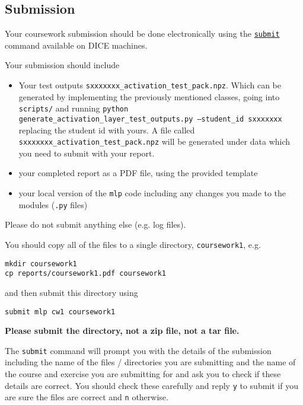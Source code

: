 \documentclass[11pt,]{article}
\begin{document}
\subsection{Submission}
\label{sec:submission}

Your coursework submission should be done electronically using the
\href{http://computing.help.inf.ed.ac.uk/submit}{\texttt{submit}}
command available on DICE machines.

Your submission should include

\begin{itemize}

\item Your test outputs \texttt{sxxxxxxx\_activation\_test\_pack.npz}. Which can be generated by implementing the previously mentioned classes, going into \texttt{scripts/} and running \texttt{python generate\_activation\_layer\_test\_outputs.py --student\_id sxxxxxxx} replacing the student id with yours. A file called \texttt{sxxxxxxx\_activation\_test\_pack.npz} will be generated under data which you need to submit with your report.
\item
  your completed report as a PDF file, using the provided template
\item
  your local version of the \texttt{mlp} code including any changes
  you made to the modules (\texttt{.py} files)
\end{itemize}
Please do not submit anything else (e.g. log files).

You should copy all of the files to a single directory, \verb+coursework1+, e.g.

\begin{verbatim}
mkdir coursework1
cp reports/coursework1.pdf coursework1
\end{verbatim}


and then submit this directory using

\begin{verbatim}
submit mlp cw1 coursework1
\end{verbatim}

\textbf{Please submit the directory, not a zip file, not a tar file.}

The \texttt{submit} command will prompt you with the details of the
submission including the name of the files / directories you are
submitting and the name of the course and exercise you are submitting
for and ask you to check if these details are correct. You should check
these carefully and reply \texttt{y} to submit if you are sure the files
are correct and \texttt{n} otherwise.
\end{document}
